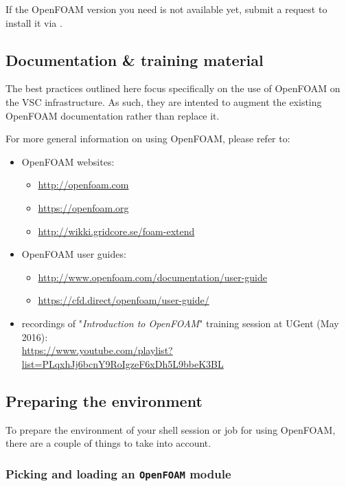 If the OpenFOAM version you need is not available yet, submit a request to install it via \hpcinfo.


\subsection{Documentation \& training material}
\label{sec:best-practices-openfoam-documentation}

The best practices outlined here focus specifically on the use of OpenFOAM on the VSC \hpc infrastructure.
As such, they are intented to augment the existing OpenFOAM documentation rather than replace it.

For more general information on using OpenFOAM, please refer to:

\begin{itemize}
\item OpenFOAM websites:
\begin{itemize}
    \item \url{http://openfoam.com}
    \item \url{https://openfoam.org}
    \item \url{http://wikki.gridcore.se/foam-extend}
\end{itemize}
\item OpenFOAM user guides:
    \begin{itemize}
    \item \url{http://www.openfoam.com/documentation/user-guide}
    \item \url{https://cfd.direct/openfoam/user-guide/}
    \end{itemize}
\item recordings of "\textit{Introduction to OpenFOAM}" training session at UGent (May 2016):\\
      \small{\url{https://www.youtube.com/playlist?list=PLqxhJj6bcnY9RoIgzeF6xDh5L9bbeK3BL}}
\end{itemize}


\subsection{Preparing the environment}
\label{sec:best-practices-openfoam-environment}

To prepare the environment of your shell session or job for using OpenFOAM,
there are a couple of things to take into account.


\subsubsection{Picking and loading an {\small\texttt{OpenFOAM}} module}

